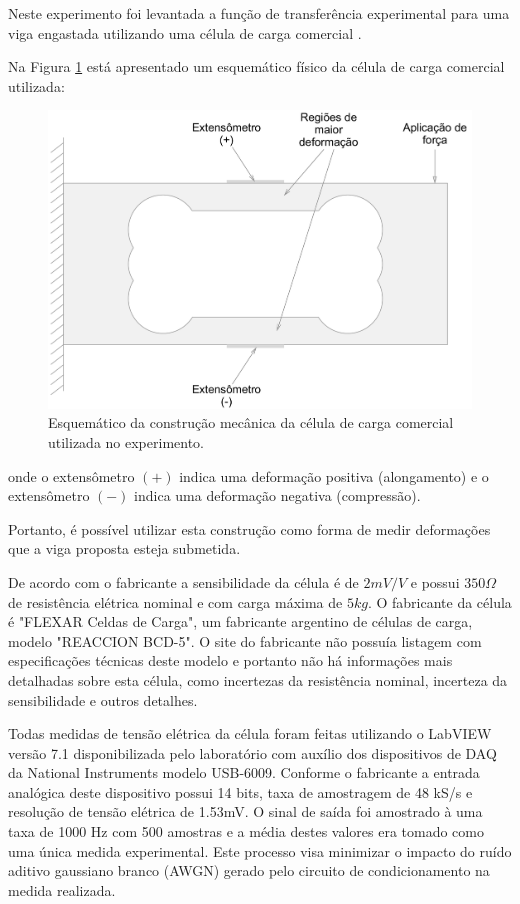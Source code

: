 \documentclass[a4paper]{instrumentacao}
\begin{document}
Neste experimento foi levantada a função de transferência experimental para uma viga engastada utilizando uma célula de carga comercial .

Na Figura \ref{fig:celula-comercial-esquema-fisico} está apresentado um esquemático físico da célula de carga comercial utilizada:

\begin{figure}[H]
\center
\includegraphics[width=\textwidth]{CelulaComercial.pdf}
\caption{Esquemático da construção mecânica da célula de carga comercial utilizada no experimento.}
\label{fig:celula-comercial-esquema-fisico}
\end{figure}

\noindent onde o extensômetro $(+)$ indica uma deformação positiva (alongamento) e o extensômetro $(-)$ indica uma deformação negativa (compressão).

Portanto, é possível utilizar esta construção como forma de medir deformações que a viga proposta esteja submetida.

De acordo com o fabricante a sensibilidade da célula é de $2 mV/V$ e possui $350 \Omega$ de resistência elétrica nominal e com carga máxima de $5 kg$.  O fabricante da célula é "FLEXAR Celdas de Carga", um fabricante argentino de células de carga, modelo "REACCION BCD-5". O site do fabricante não possuía listagem com especificações técnicas deste modelo e portanto não há informações mais detalhadas sobre esta célula, como incertezas da resistência nominal, incerteza da sensibilidade e outros detalhes.

Todas medidas de tensão elétrica da célula foram feitas utilizando o LabVIEW versão 7.1 disponibilizada pelo laboratório com auxílio dos dispositivos de DAQ da National Instruments modelo USB-6009. Conforme o fabricante \cite{daq-specifications} a entrada analógica deste dispositivo possui 14 bits, taxa de amostragem de 48 kS/s e resolução de tensão elétrica de 1.53mV. O sinal de saída foi amostrado à uma taxa de 1000 Hz com 500 amostras e a média destes valores era tomado como uma única medida experimental. Este processo visa minimizar o impacto do ruído aditivo gaussiano branco (AWGN) gerado pelo circuito de condicionamento na medida realizada.
\end{document}
